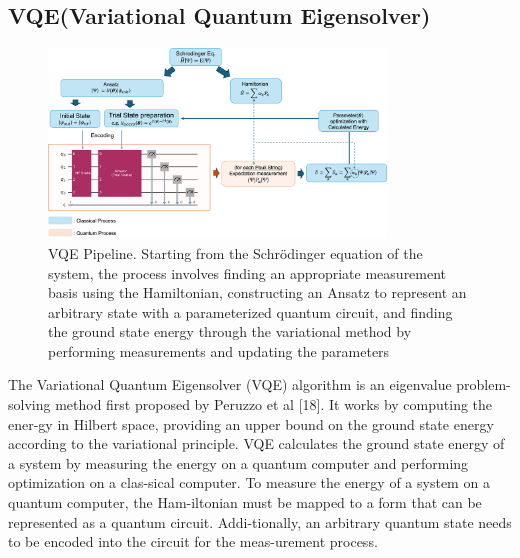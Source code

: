\documentclass[pdflatex,sn-mathphys-num]{sn-jnl}%
\theoremstyle{thmstyleone}%
\theoremstyle{thmstyletwo}%
\theoremstyle{thmstylethree}%
\begin{document}
\subsection{VQE(Variational Quantum Eigensolver)}\label{subsec2.2}
\begin{figure}[H]
\centering
\includegraphics[width=0.8\textwidth]{fig/VQE_pipeline.png}
\caption{VQE Pipeline. Starting from the Schrödinger equation of the system, the process involves finding an appropriate measurement basis using the Hamiltonian, constructing an Ansatz to represent an arbitrary state with a parameterized quantum circuit, and finding the ground state energy through the variational method by performing measurements and updating the parameters}\label{Fig.2}
\end{figure}
The Variational Quantum Eigensolver (VQE) algorithm is an eigenvalue problem-solving method first proposed by Peruzzo et al [18]. It works by computing the ener-gy in Hilbert space, providing an upper bound on the ground state energy according to the variational principle. VQE calculates the ground state energy of a system by measuring the energy on a quantum computer and performing optimization on a clas-sical computer. To measure the energy of a system on a quantum computer, the Ham-iltonian must be mapped to a form that can be represented as a quantum circuit. Addi-tionally, an arbitrary quantum state needs to be encoded into the circuit for the meas-urement process.
\end{document}
